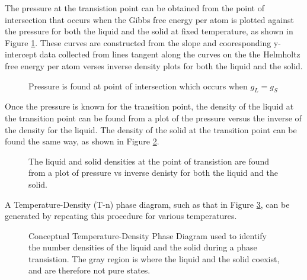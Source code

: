 \documentclass[double,12pt]{beavtex}
\begin{document}
The pressure at the transistion point can be obtained from the point of intersection that occurs when the Gibbs free energy per atom is plotted against the pressure for both the liquid and the solid at fixed temperature, as shown in Figure \ref{fig:GibbsvsP}. These curves are constructed from the slope and cooresponding y-intercept data collected from lines tangent along the curves on the the Helmholtz free energy per atom verses inverse density plots for both the liquid and the solid. 
\begin{figure}[h!]
    \centering
    \caption{Pressure is found at point of intersection which occurs when $g_L=g_S$}
    \label{fig:GibbsvsP}
  \end{figure}


Once the pressure is known for the transition point, the density of the liquid at the transition point can be found from a plot of the pressure versus the inverse of the density for the liquid. The density of the solid at the transition point can be found the same way, as shown in Figure \ref{fig:Pvsinvn}.

\begin{figure}[h!]
    \centering
    \caption{The liquid and solid densities at the point of transistion are found from a plot of pressure vs inverse denisty for both the liquid and the solid.}
    \label{fig:Pvsinvn}
  \end{figure}

A Temperature-Density (T-n) phase diagram, such as that in Figure \ref{fig:T-n_Diagram}, can be generated by repeating this procedure for various temperatures. %

\begin{figure}[h!]
    \centering
    \caption{Conceptual Temperature-Density Phase Diagram used to identify the number densities of the liquid and the solid during a phase transistion. The gray region is where the liquid and the solid coexist, and are therefore not pure states.}
    \label{fig:T-n_Diagram}
  \end{figure} 
\[\]
\end{document}
